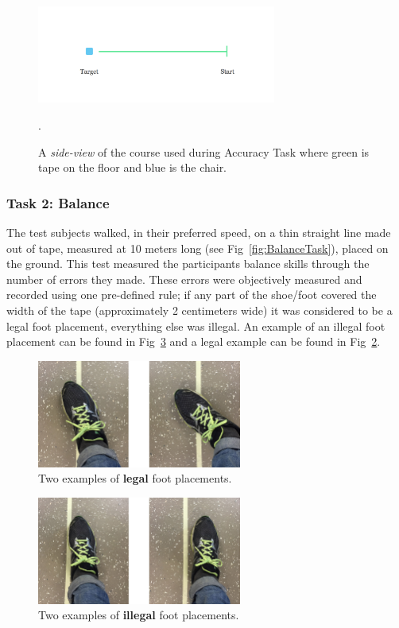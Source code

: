 \documentclass[runningheads,a4paper,oribibl]{llncs}
\begin{document}
\begin{figure}
   \centering
   \includegraphics[width=0.7\textwidth]{ExternalMaterial/AccuracyTask}
   \caption{A \emph{side-view} of the course used during Accuracy Task where green is tape on the floor and blue is the chair.}. \label{fig:AccuracyTask}
\end{figure}

\subsubsection{Task 2: Balance}

The test subjects walked, in their preferred speed, on a thin straight line made out of tape, measured at 10 meters long (see Fig~\ref{fig:BalanceTask}), placed on the ground. This test measured the participants balance skills through the number of errors they made. These errors were objectively measured and recorded using one pre-defined rule; if any part of the shoe/foot covered the width of the tape (approximately 2 centimeters wide) it was considered to be a legal foot placement, everything else was illegal. An example of an illegal foot placement can be found in Fig~\ref{fig:Illegal} and a legal example can be found in Fig~\ref{fig:Legal}.

\begin{figure}
   \centering
   \includegraphics[width=0.6\textwidth]{ExternalMaterial/Legal}
   \caption{Two examples of \textbf{legal} foot placements.} \label{fig:Legal}
\end{figure}

\begin{figure}
   \centering
   \includegraphics[width=0.6\textwidth]{ExternalMaterial/Illegal}
   \caption{Two examples of \textbf{illegal} foot placements.} \label{fig:Illegal}
\end{figure}
\end{document}
